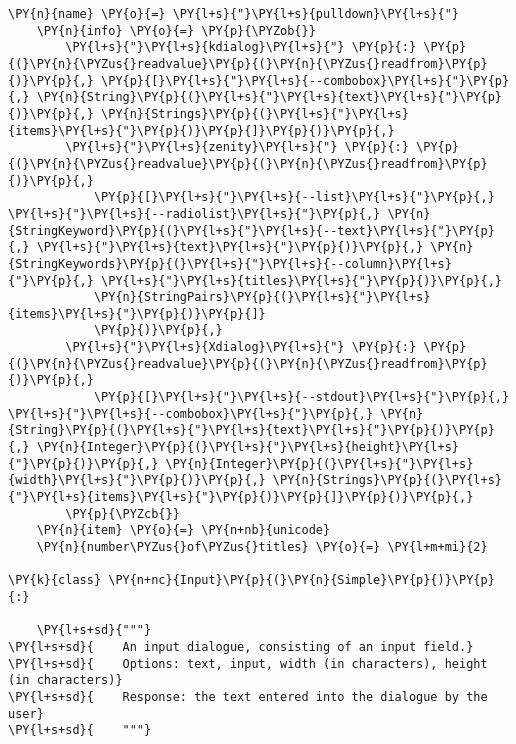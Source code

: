 \begin{Verbatim}[commandchars=\\\{\}]
    \PY{n}{name} \PY{o}{=} \PY{l+s}{"}\PY{l+s}{pulldown}\PY{l+s}{"}
    \PY{n}{info} \PY{o}{=} \PY{p}{\PYZob{}}
        \PY{l+s}{"}\PY{l+s}{kdialog}\PY{l+s}{"} \PY{p}{:} \PY{p}{(}\PY{n}{\PYZus{}readvalue}\PY{p}{(}\PY{n}{\PYZus{}readfrom}\PY{p}{)}\PY{p}{,} \PY{p}{[}\PY{l+s}{"}\PY{l+s}{--combobox}\PY{l+s}{"}\PY{p}{,} \PY{n}{String}\PY{p}{(}\PY{l+s}{"}\PY{l+s}{text}\PY{l+s}{"}\PY{p}{)}\PY{p}{,} \PY{n}{Strings}\PY{p}{(}\PY{l+s}{"}\PY{l+s}{items}\PY{l+s}{"}\PY{p}{)}\PY{p}{]}\PY{p}{)}\PY{p}{,}
        \PY{l+s}{"}\PY{l+s}{zenity}\PY{l+s}{"} \PY{p}{:} \PY{p}{(}\PY{n}{\PYZus{}readvalue}\PY{p}{(}\PY{n}{\PYZus{}readfrom}\PY{p}{)}\PY{p}{,}
            \PY{p}{[}\PY{l+s}{"}\PY{l+s}{--list}\PY{l+s}{"}\PY{p}{,} \PY{l+s}{"}\PY{l+s}{--radiolist}\PY{l+s}{"}\PY{p}{,} \PY{n}{StringKeyword}\PY{p}{(}\PY{l+s}{"}\PY{l+s}{--text}\PY{l+s}{"}\PY{p}{,} \PY{l+s}{"}\PY{l+s}{text}\PY{l+s}{"}\PY{p}{)}\PY{p}{,} \PY{n}{StringKeywords}\PY{p}{(}\PY{l+s}{"}\PY{l+s}{--column}\PY{l+s}{"}\PY{p}{,} \PY{l+s}{"}\PY{l+s}{titles}\PY{l+s}{"}\PY{p}{)}\PY{p}{,}
            \PY{n}{StringPairs}\PY{p}{(}\PY{l+s}{"}\PY{l+s}{items}\PY{l+s}{"}\PY{p}{)}\PY{p}{]}
            \PY{p}{)}\PY{p}{,}
        \PY{l+s}{"}\PY{l+s}{Xdialog}\PY{l+s}{"} \PY{p}{:} \PY{p}{(}\PY{n}{\PYZus{}readvalue}\PY{p}{(}\PY{n}{\PYZus{}readfrom}\PY{p}{)}\PY{p}{,}
            \PY{p}{[}\PY{l+s}{"}\PY{l+s}{--stdout}\PY{l+s}{"}\PY{p}{,} \PY{l+s}{"}\PY{l+s}{--combobox}\PY{l+s}{"}\PY{p}{,} \PY{n}{String}\PY{p}{(}\PY{l+s}{"}\PY{l+s}{text}\PY{l+s}{"}\PY{p}{)}\PY{p}{,} \PY{n}{Integer}\PY{p}{(}\PY{l+s}{"}\PY{l+s}{height}\PY{l+s}{"}\PY{p}{)}\PY{p}{,} \PY{n}{Integer}\PY{p}{(}\PY{l+s}{"}\PY{l+s}{width}\PY{l+s}{"}\PY{p}{)}\PY{p}{,} \PY{n}{Strings}\PY{p}{(}\PY{l+s}{"}\PY{l+s}{items}\PY{l+s}{"}\PY{p}{)}\PY{p}{]}\PY{p}{)}\PY{p}{,}
        \PY{p}{\PYZcb{}}
    \PY{n}{item} \PY{o}{=} \PY{n+nb}{unicode}
    \PY{n}{number\PYZus{}of\PYZus{}titles} \PY{o}{=} \PY{l+m+mi}{2}

\PY{k}{class} \PY{n+nc}{Input}\PY{p}{(}\PY{n}{Simple}\PY{p}{)}\PY{p}{:}

    \PY{l+s+sd}{"""}
\PY{l+s+sd}{    An input dialogue, consisting of an input field.}
\PY{l+s+sd}{    Options: text, input, width (in characters), height (in characters)}
\PY{l+s+sd}{    Response: the text entered into the dialogue by the user}
\PY{l+s+sd}{    """}


\end{Verbatim}
